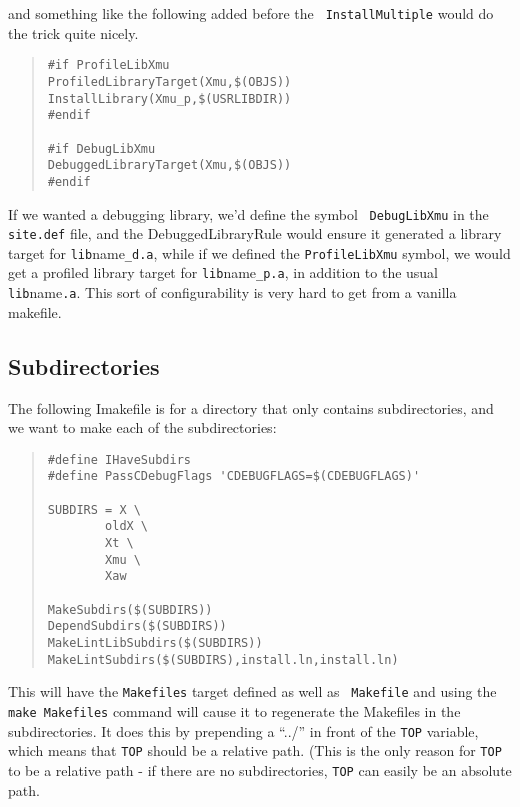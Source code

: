 and something like the following added before the {\tt
InstallMultiple} would do the trick quite nicely.

\begin{quote}
\begin{verbatim}
#if ProfileLibXmu 
ProfiledLibraryTarget(Xmu,$(OBJS))
InstallLibrary(Xmu_p,$(USRLIBDIR))
#endif

#if DebugLibXmu
DebuggedLibraryTarget(Xmu,$(OBJS))
#endif
\end{verbatim}
\end{quote}

If we wanted a debugging library, we'd define the symbol {\tt
DebugLibXmu} in the {\tt site.def} file, and the DebuggedLibraryRule
would ensure it generated a library target for {\tt lib}name{\tt \_d.a},
while if we defined the {\tt ProfileLibXmu} symbol, we would get a
profiled library target for {\tt lib}name{\tt \_p.a}, in addition to
the usual {\tt lib}name{\tt .a}. This sort of configurability is very
hard to get from a vanilla makefile.

\subsection{Subdirectories}

The following Imakefile is for a directory that only contains
subdirectories, and we want to make each of the subdirectories:

\begin{quote}
\begin{verbatim}
#define IHaveSubdirs
#define PassCDebugFlags 'CDEBUGFLAGS=$(CDEBUGFLAGS)'

SUBDIRS = X \
        oldX \
        Xt \
        Xmu \
        Xaw

MakeSubdirs($(SUBDIRS))
DependSubdirs($(SUBDIRS))
MakeLintLibSubdirs($(SUBDIRS))
MakeLintSubdirs($(SUBDIRS),install.ln,install.ln)

\end{verbatim}
\end{quote}

This will have the {\tt Makefiles} target defined as well as {\tt
Makefile} and using the {\tt make Makefiles} command will cause it to
regenerate the Makefiles in the subdirectories. It does this by
prepending a ``../'' in front of the {\tt TOP} variable, which
means that {\tt TOP} should be a relative path. (This is the only
reason for {\tt TOP} to be a relative path - if there are no
subdirectories, {\tt TOP} can easily be an absolute path.

